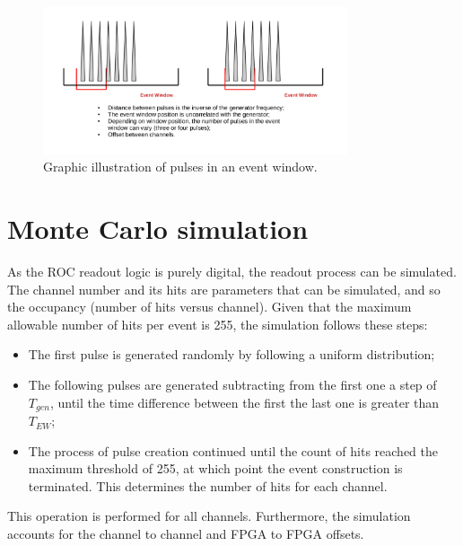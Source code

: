 \begin{figure}[!h]
\centering
\includegraphics[width =0.8\textwidth]{figures/pdf/sodapdf-converted-1}
\caption{Graphic illustration of pulses in an event window.}
\label{fig:3}
\end{figure}
\section{Monte Carlo simulation}\label{MonteCarlo}
 
As the ROC readout logic is purely digital, the readout process can be simulated.
The channel number and its hits are parameters that can be simulated, and so the occupancy (number of hits versus channel).
Given that the maximum allowable number of hits per event is 255, the simulation follows these steps:
\begin{itemize}
  \item The first pulse is generated randomly by following a uniform distribution;
    \item The following pulses are generated subtracting from the first one a step of $T_{gen}$, until the time difference between the 
first the last one is greater than $T_{EW}$;
  \item The process of pulse creation continued until the count of hits reached the maximum threshold of 255,
 at which point the event construction is terminated. This determines the number of hits for each channel.
\end{itemize}
This operation is performed for all channels.
Furthermore, the simulation accounts for the channel to channel and FPGA to FPGA offsets. 



